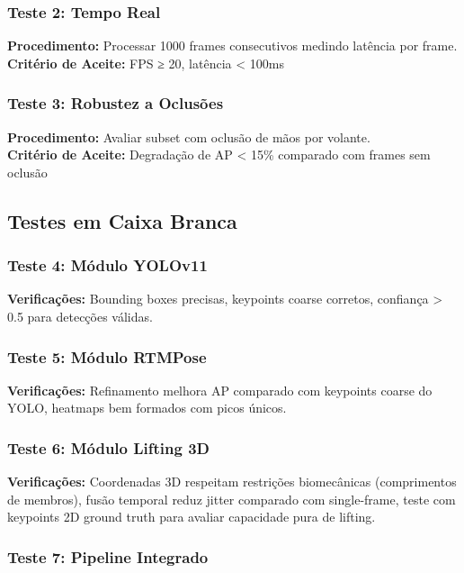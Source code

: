 \documentclass[12pt, a4paper]{article}
\begin{document}
\subsubsection{Teste 2: Tempo Real}

\textbf{Procedimento:} Processar 1000 frames consecutivos medindo latência por frame.\\
\textbf{Critério de Aceite:} FPS ≥ 20, latência < 100ms

\subsubsection{Teste 3: Robustez a Oclusões}

\textbf{Procedimento:} Avaliar subset com oclusão de mãos por volante.\\
\textbf{Critério de Aceite:} Degradação de AP < 15\% comparado com frames sem oclusão

\subsection{Testes em Caixa Branca}

\subsubsection{Teste 4: Módulo YOLOv11}

\textbf{Verificações:} Bounding boxes precisas, keypoints coarse corretos, confiança > 0.5 para detecções válidas.

\subsubsection{Teste 5: Módulo RTMPose}

\textbf{Verificações:} Refinamento melhora AP comparado com keypoints coarse do YOLO, heatmaps bem formados com picos únicos.

\subsubsection{Teste 6: Módulo Lifting 3D}

\textbf{Verificações:} Coordenadas 3D respeitam restrições biomecânicas (comprimentos de membros), fusão temporal reduz jitter comparado com single-frame, teste com keypoints 2D ground truth para avaliar capacidade pura de lifting.

\subsubsection{Teste 7: Pipeline Integrado}
\end{document}
